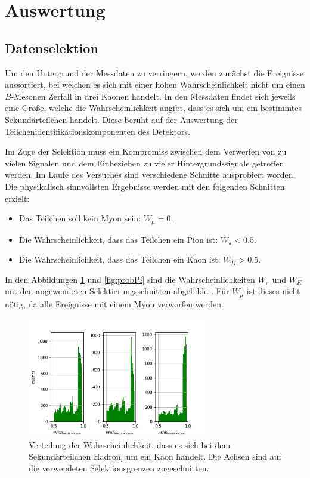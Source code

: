 \section{Auswertung}
\subsection{Datenselektion}
Um den Untergrund der Messdaten zu verringern, werden zunächst die Ereignisse aussortiert, bei welchen es sich mit einer hohen Wahrscheinlichkeit nicht um einen $B$-Mesonen Zerfall in drei Kaonen handelt. In den Messdaten findet sich jeweils eine Größe, welche die Wahrscheinlichkeit angibt, dass es sich um ein bestimmtes Sekundärteilchen handelt. Diese beruht auf der Auswertung der Teilchenidentifikationskomponenten des Detektors.

Im Zuge der Selektion muss ein Kompromiss zwischen dem Verwerfen von zu vielen Signalen und dem Einbeziehen zu vieler Hintergrundssignale getroffen werden.
Im Laufe des Versuches sind verschiedene Schnitte ausprobiert worden. Die physikalisch sinnvollsten Ergebnisse werden mit den folgenden Schnitten erzielt:
\begin{itemize}
  \item Das Teilchen soll kein Myon sein: $W_{\mu}=0$.
  \item Die Wahrscheinlichkeit, dass das Teilchen ein Pion ist: $W_{\pi}<0.5$.
  \item Die Wahrscheinlichkeit, dass das Teilchen ein Kaon ist: $W_{K}>0.5$.
\end{itemize}
In den Abbildungen \ref{fig:probK} und \ref{fig:probPi} sind die Wahrscheinlichkeiten $W_{\pi}$ und $W_{K}$ mit den angewendeten Selektierungsschnitten abgebildet. Für $W_{\mu}$ ist dieses nicht nötig, da alle Ereignisse mit einem Myon verworfen werden.
\begin{figure}
  \centering
  \includegraphics[width=0.7\textwidth]{plots/sim_ProbK_hist.png}
  \caption{Verteilung der Wahrscheinlichkeit, dass es sich bei dem Sekundärteilchen Hadron$_i$ um ein Kaon handelt. Die Achsen sind auf die verwendeten Selektionsgrenzen zugeschnitten.}
  \label{fig:probK}
\end{figure} 
